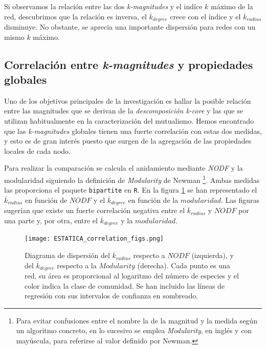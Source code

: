 Si observamos la relación entre las dos \textit{k-magnitudes} y el indíce $k$ máximo de la red, descubrimos que la relación es inversa, el $\overline{k}_{degree}$ crece con el índice y el $\overline{k}_{radius}$ disminuye. No obstante, se aprecia una importante dispersión para redes con un mismo $k$ máximo.


\subsection{Correlación entre \textit{k-magnitudes} y propiedades globales}

Uno de los objetivos principales de la investigación es hallar la posible relación entre las magnitudes que se derivan de la \textit{descomposición k-core} y las que se utilizan habitualmente en la caracterización del mutualismo. Hemos encontrado que las \textit{k-magnitudes} globales tienen una fuerte correlación con estas dos medidas, y esto es de gran interés puesto que surgen de la agregación de las propiedades locales de cada nodo.

Para realizar la comparación se calcula el anidamiento mediante \textit{NODF} y la modularidad siguiendo la definición de \textit{Modularity} de Newman \cite{almeida2008consistent, newman2004finding} \footnote{Para evitar confusiones entre el nombre la de la magnitud y la medida según un algoritmo concreto, en lo sucesivo se emplea \textit{Modularity}, en inglés y con mayúscula, para referirse al valor definido por Newman.}. Ambas medidas las proporciona el paquete \texttt{bipartite} en \texttt{R}. En la figura \ref{fig:ESTATICA_corrfigs} se han representado el $\overline {k}_{radius}$ en función de $NODF$ y el $\overline {k}_{degree}$ en función de la $modularidad$. Las figuras sugerían que existe un fuerte correlación negativa entre el $\overline {k}_{radius}$ y $NODF$ por una parte y, por otra, entre el $\overline {k}_{degree}$ y la $modularidad$. 

\begin{figure}[h!]
\centering
\texttt{[image: ESTATICA\_correlation\_figs.png]}
\caption {Diagrama de dispersión del $\overline {k}_{radius}$ respecto a $NODF$ (izquierda), y del $\overline {k}_{degree}$ respecto a la $Modularity$ (derecha). Cada punto es una red, su área es proporcional al logaritmo del número de especies y el color indica la clase de comunidad. Se han incluido las líneas de regresión con sus intervalos de confianza en sombreado.}
\label{fig:ESTATICA_corrfigs}
\end{figure}

